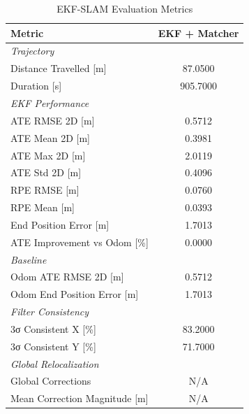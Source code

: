 \begin{table}[htbp]
\centering
\caption{EKF-SLAM Evaluation Metrics}
\label{tab:ekf_results}
\begin{tabular}{lc}
\toprule
Metric & \textbf{EKF + Matcher} \\
\midrule
\multicolumn{2}{l}{\textit{Trajectory}} \\
Distance Travelled [m] & 87.0500 \\
Duration [s] & 905.7000 \\
\midrule
\multicolumn{2}{l}{\textit{EKF Performance}} \\
ATE RMSE 2D [m] & 0.5712 \\
ATE Mean 2D [m] & 0.3981 \\
ATE Max 2D [m] & 2.0119 \\
ATE Std 2D [m] & 0.4096 \\
RPE RMSE [m] & 0.0760 \\
RPE Mean [m] & 0.0393 \\
End Position Error [m] & 1.7013 \\
ATE Improvement vs Odom [\%] & 0.0000 \\
\midrule
\multicolumn{2}{l}{\textit{Baseline}} \\
Odom ATE RMSE 2D [m] & 0.5712 \\
Odom End Position Error [m] & 1.7013 \\
\midrule
\multicolumn{2}{l}{\textit{Filter Consistency}} \\
3σ Consistent X [\%] & 83.2000 \\
3σ Consistent Y [\%] & 71.7000 \\
\midrule
\multicolumn{2}{l}{\textit{Global Relocalization}} \\
Global Corrections & N/A \\
Mean Correction Magnitude [m] & N/A \\
\midrule
\bottomrule
\end{tabular}
\end{table}